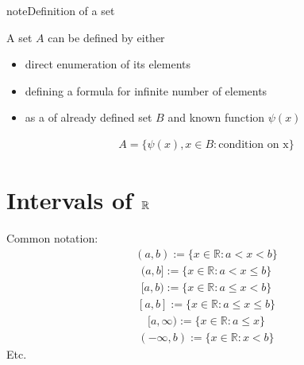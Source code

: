 \documentclass[letterpaper,10pt,english]{jupyterBook}
\begin{document}
\begin{sphinxadmonition}{note}{Definition of a set}

\sphinxAtStartPar
A set \(A\) can be defined by either
\begin{itemize}
\item {} 
\sphinxAtStartPar
direct enumeration of its elements

\item {} 
\sphinxAtStartPar
defining a formula for infinite number of elements

\item {} 
\sphinxAtStartPar
as a  of already defined set \(B\) and known function \(\psi(x)\)

\end{itemize}
\begin{equation*}
\begin{split}
A = \{ \psi(x), x \in B \colon \text{condition on x}\}
\end{split}
\end{equation*}\end{sphinxadmonition}


\section{Intervals of \protect\(\mathbb{R}\protect\)}
\label{\detokenize{03.set_theory:intervals-of-mathbb-r}}
\sphinxAtStartPar
Common notation:
\begin{equation*}
\begin{split}
(a, b)  := \{ x \in \mathbb{R} : a < x < b \}
\end{split}
\end{equation*}\begin{equation*}
\begin{split}
(a, b]  := \{ x \in \mathbb{R} : a < x \leq b \}
\end{split}
\end{equation*}\begin{equation*}
\begin{split}
[a, b)  := \{ x \in \mathbb{R} : a \leq x < b \}
\end{split}
\end{equation*}\begin{equation*}
\begin{split}
[a, b]  := \{ x \in \mathbb{R} : a \leq x \leq b \}
\end{split}
\end{equation*}\begin{equation*}
\begin{split}
[a, \infty) := \{ x \in \mathbb{R} : a \leq x  \}
\end{split}
\end{equation*}\begin{equation*}
\begin{split}
(-\infty, b) := \{ x \in \mathbb{R} :  x < b  \}
\end{split}
\end{equation*}
\sphinxAtStartPar
Etc.
\end{document}
